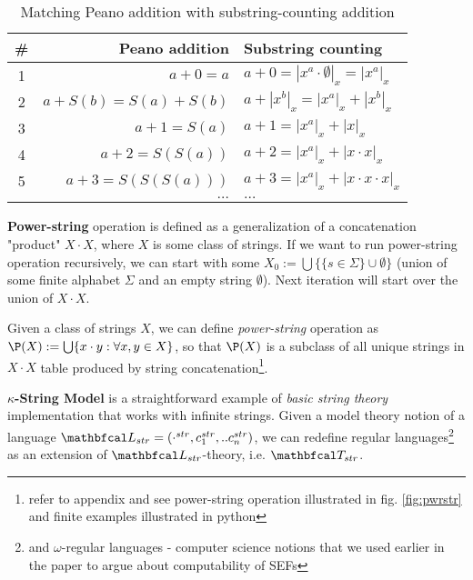 \begin{table}[ht]
\caption{Matching Peano addition with substring-counting addition}
\centering
\begin{tabular}{ |c|r|l| }
  \hline
  \# & Peano addition                  & Substring counting                            \\
  \hline
  1  & $a + 0 = a$              & $a + 0 = |x^a \cdot \emptyset|_x = |x^a|_x$         \\
  2  & $a + S(b) = S(a) + S(b)$ & $a + |x^b|_x = |x^a|_x + |x^b|_x$ \\
  \hline
  3  & $a + 1 =  S(a) $         & $a + 1 = |x^a|_x + |x|_x$                     \\
  4  & $a + 2 =  S(S(a)) $      & $a + 2 = |x^a|_x + |x \cdot x|_x$                     \\
  5  & $a + 3 =  S(S(S(a))) $   & $a + 3 = |x^a|_x + |x \cdot x \cdot x|_x$                     \\
     & $\dots $                 & $\dots $                                      \\
  \hline
\end{tabular}
\label{Tab:PeanoSubstr}
\end{table}




\textbf{Power-string} operation is defined as a generalization of a concatenation "product" $X \cdot X$, where $X$ is some class of strings. If we want to run power-string operation recursively, we can start with some $X_0 := \bigcup \{\{s \in \Sigma\} \cup \emptyset\}$ (union of some finite alphabet $\Sigma$ and an empty string $\emptyset$). Next iteration will start over the union of $X \cdot X$.

\begin{definition}\label{def_pwrstr}
  Given a class of strings $X$, we can define \textit{power-string} operation as $\P(X) := \bigcup \{x \cdot y : \forall x,y \in X\}$, so that $\P(X)$ is a subclass of all unique strings in $X \cdot X$ table produced by string concatenation\footnote{refer to appendix and see power-string operation illustrated in fig. \ref{fig:pwrstr} and finite examples illustrated in python}.
\end{definition}




\textbf{$\kappa$-String Model} is a straightforward example of \textit{basic string theory} implementation that works with infinite strings. Given a model theory notion of a language $\lsign_{str} = (\cdot^{str},c_1^{str},..c_n^{str})$, we can redefine regular languages\footnote{and $\omega$-regular languages - computer science notions that we used earlier in the paper to argue about computability of SEFs} as an extension of $\lsign_{str}$-theory, i.e. $\LsT_{str}$. 


